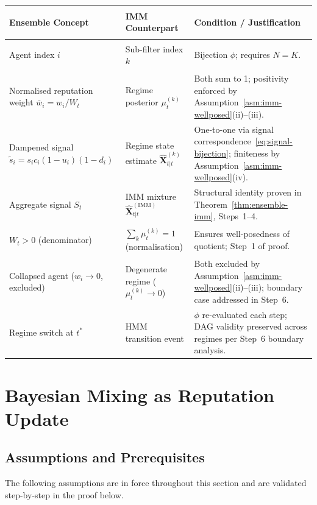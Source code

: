 \documentclass[12pt,openany]{book}
\numberwithin{equation}{chapter}
\theoremstyle{plain}
\theoremstyle{definition}
\theoremstyle{remark}
\begin{document}
\begin{center}
\begin{tabularx}{\linewidth}{%
  >{\bfseries\raggedright\arraybackslash}p{3.0cm}
  >{\raggedright\arraybackslash}p{3.2cm}
  >{\raggedright\arraybackslash}X}
\toprule
\textbf{Ensemble Concept} &
\textbf{IMM Counterpart} &
\textbf{Condition / Justification} \\
\midrule
Agent index $i$ &
Sub-filter index $k$ &
Bijection $\phi$; requires $N=K$. \\[3pt]
Normalised reputation weight
$\bar{w}_i = w_i / W_t$ &
Regime posterior $\mu_t^{(k)}$ &
Both sum to 1; positivity enforced by
Assumption~\ref{asm:imm-wellposed}(ii)--(iii). \\[3pt]
Dampened signal
$\tilde{s}_i = s_i c_i(1{-}u_i)(1{-}d_i)$ &
Regime state estimate
$\hat{\mathbf{X}}_{t|t}^{(k)}$ &
One-to-one via signal
correspondence~\eqref{eq:signal-bijection};
finiteness by
Assumption~\ref{asm:imm-wellposed}(iv). \\[3pt]
Aggregate signal $S_t$ &
IMM mixture
$\hat{\mathbf{X}}_{t|t}^{(\mathrm{IMM})}$ &
Structural identity proven in
Theorem~\ref{thm:ensemble-imm},
Steps~1--4. \\[3pt]
$W_t > 0$ (denominator) &
$\sum_k \mu_t^{(k)} = 1$ (normalisation) &
Ensures well-posedness of quotient;
Step~1 of proof. \\[3pt]
Collapsed agent ($w_i\to 0$, excluded) &
Degenerate regime ($\mu_t^{(k)}\to 0$) &
Both excluded by
Assumption~\ref{asm:imm-wellposed}(ii)--(iii);
boundary case addressed in Step~6. \\[3pt]
Regime switch at $t^*$ &
HMM transition event &
$\phi$ re-evaluated each step;
DAG validity preserved across regimes
per Step~6 boundary analysis. \\
\bottomrule
\end{tabularx}
\end{center}

\section{Bayesian Mixing as Reputation Update}

\subsection{Assumptions and Prerequisites}

The following assumptions are in force throughout this section and
are validated step-by-step in the proof below.
\end{document}
